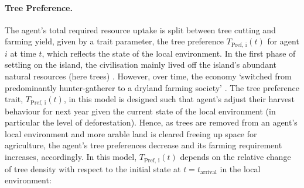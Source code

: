 \paragraph{Tree Preference.}
The agent's total required resource uptake is split between tree cutting and farming yield, given by a trait parameter, the tree preference $T_\text{Pref, i}(t)$ for agent $i$ at time $t$, which reflects the state of the local environment.
In the first phase of settling on the island, the civilisation mainly lived off the island's abundant natural resources (here trees) \citep{Bahn2017}.
However, over time, the economy `switched from predominantly hunter-gatherer to a dryland farming society' \citep{Louwagie2006}.
The tree preference trait, $T_\text{Pref, i}(t)$, in this model is designed such that agent's adjust their harvest behaviour for next year given the current state of the local environment (in particular the level of deforestation).
Hence, as trees are removed from an agent's local environment and more arable land is cleared freeing up space for agriculture, the agent's tree preferences decrease and its farming requirement increases, accordingly.
In this model, $T_\text{Pref, i}(t)$ depends on the relative change of tree density with respect to the initial state at $t=t_\text{arrival}$ in the local environment:
